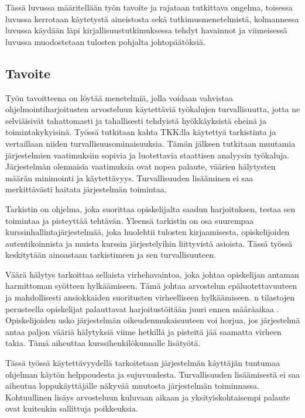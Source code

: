 Tässä luvussa määritellään työn tavoite ja rajataan tutkittava ongelma,
toisessa luvussa kerrotaan käytetystä aineistosta sekä tutkimusmenetelmistä,
kolmannessa luvussa käydään läpi kirjallisuustutkimuksessa tehdyt havainnot
ja viimeisessä luvussa muodostetaan tulosten pohjalta johtopäätöksiä.

\subsection{Tavoite}

Työn tavoitteena on löytää menetelmiä, jolla voidaan vahvistaa
ohjelmointiharjoitusten arvosteluun käytettäviä työkalujen turvallisuutta,
jotta ne selviäisivät tahattomasti ja tahallisesti tehdyistä hyökkäyksistä
eheinä ja toimintakykyisinä. Työssä tutkitaan kahta TKK:lla käytettyä
tarkistinta ja vertaillaan niiden turvallisuusominaisuuksia.
Tämän jälkeen tutkitaan muutamia järjestelmien vaatimuksiin sopivia ja
luotettavia staattisen analyysin työkaluja. Järjestelmän olennaisia vaatimuksia
ovat nopea palaute, väärien hälytysten määrän minimointi ja käytettävyys.
Turvallisuuden lisääminen ei saa merkittävästi haitata järjestelmän toimintaa.

Tarkistin on ohjelma, joka suorittaa opiskelijalta saadun harjoituksen,
testaa sen toimintaa ja pisteyttää tehtävän. Yleensä tarkistin on osa suurempaa
kurssinhallintajärjestelmää, joka huolehtii tulosten kirjaamisesta,
opiskelijoiden autentikoinnista ja muista kurssin järjestelyihin liittyvistä
asioista. Tässä työssä keskitytään ainoastaan tarkistimeen ja sen
turvallisuuteen.

Väärä hälytys tarkoittaa sellaista virhehavaintoa, joka johtaa opiskelijan
antaman harmittoman syötteen hylkäämiseen. Tämä johtaa arvostelun
epäluotettavuuteen ja mahdollisesti ansiokkaiden suoritusten virheelliseen
hylkäämiseen. {\scmrobo}n tilastojen perusteella opiskelijat palauttavat
harjoitustöitään juuri ennen määräaikaa \citep{saikkonen2001fully}.
Opiskelijoiden usko järjestelmän oikeudenmukaisuuteen voi horjua, jos
järjestelmä antaa paljon vääriä hälytyksiä viime hetkillä ja pisteitä jää
saamatta virheen takia. Tämä aiheuttaa kurssihenkilökunnalle lisätyötä.

Tässä työssä käytettävyydellä tarkoitetaan järjestelmän käyttäjän tuntumaa
ohjelman käytön helppoudesta ja sujuvuudesta. Turvallisuuden lisäämisestä
ei saa aiheutua loppukäyttäjälle näkyvää muutosta järjestelmän toiminnassa.
Kohtuullinen lisäys arvosteluun kuluvaan aikaan ja yksityiskohtaisempi
palaute ovat kuitenkin sallittuja poikkeuksia.

